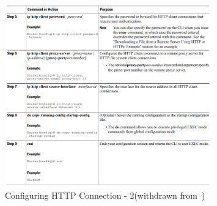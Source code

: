 %
\begin{figure}[!hbt]
\centering
    \includegraphics[width=0.8\textwidth]{./img/configure-http-2.png}
  \caption{Configuring HTTP Connection - 2(withdrawn from~\cite{http-example-cisco})}%
\label{fig:configure-http-2}
\end{figure}
%
